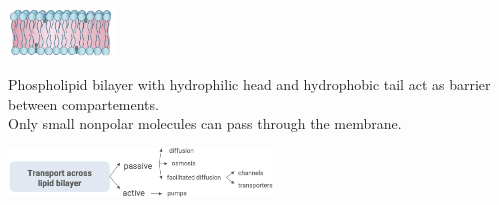 
\begin{minipage}{0.40\linewidth}
    \includegraphics[width=28mm]{src/Images/cell_membrane.png}
\end{minipage}
\begin{minipage}{0.6\linewidth}
Phospholipid bilayer with hydrophilic head and hydrophobic tail act as barrier between compartements.\\
Only small nonpolar molecules can pass through the membrane.\\
\end{minipage}

\includegraphics[width=70mm]{src/Images/transport_across_bilayer.png}

